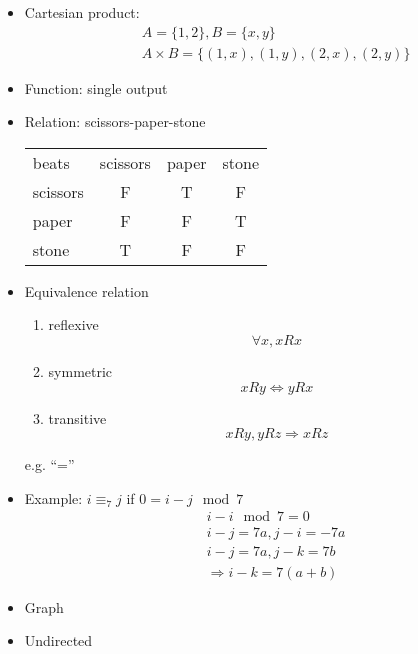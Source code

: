 \begin{frame}[allowframebreaks]
\begin{itemize}
\begin{itemize}
(7,21,57): 3-tuple
  \end{itemize}
  \item Cartesian product:
    \begin{eqnarray*}
      && A =\{1,2\}, B=\{x,y\}\\
 && A \times B = \{ (1,x), (1,y), (2,x), (2,y)\}
    \end{eqnarray*}
  \item Function: single output
  \item Relation: scissors-paper-stone
    \begin{center}
    \begin{tabular}{lccc}
      beats & scissors & paper & stone \\
scissors & F & T & F \\
paper & F & F & T\\
stone & T & F & F
    \end{tabular}
  \end{center}
  \item Equivalence relation
    \begin{enumerate}
    \item reflexive
      \begin{equation*}
        \forall x, xRx
      \end{equation*}
    \item symmetric 
      \begin{equation*}
        xRy \Leftrightarrow yRx
      \end{equation*}
    \item transitive
      \begin{equation*}
        xRy, yRz \Rightarrow xRz
      \end{equation*}
    \end{enumerate}
  e.g. ``=''
\item Example: $i \equiv_7 j$ if $0 =i -j\mod 7$
  \begin{eqnarray*}
&& i - i \mod 7 = 0\\
&& i - j = 7a, j-i=-7a\\
&& i-j = 7a, j-k = 7b\\
&& \Rightarrow i-k = 7(a+b)   
  \end{eqnarray*}

\item Graph

\item [] Undirected

  \begin{center}
\end{center}



\end{itemize}
\end{frame}
